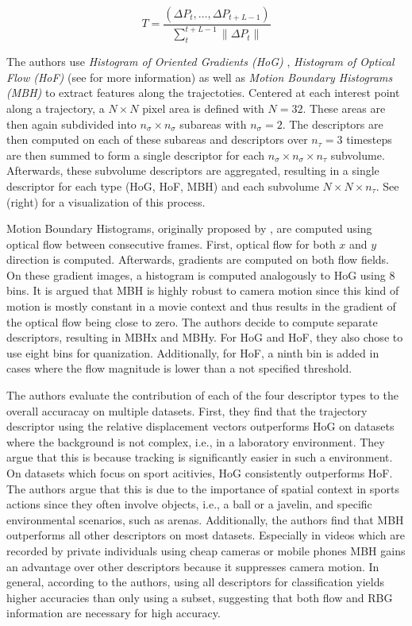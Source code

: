 \begin{equation}
    T = \frac{(\Delta P_t, \dots, \Delta P_{t + L -1})}{\sum_t^{t+L-1} \lVert \Delta P_t \rVert}
\end{equation}

The authors use \textit{Histogram of Oriented Gradients (HoG)} \cite{dalal_histograms_2005}, \textit{Histogram of Optical Flow (HoF)} \cite{laptev_learning_2008} (see  for more information) as well as \textit{Motion Boundary Histograms (MBH)} \cite{dalal_human_2006} to extract features along the trajectoties.
Centered at each interest point along a trajectory, a $N \times N$ pixel area is defined with $N = 32$.
These areas are then again subdivided into $n_\sigma \times n_\sigma$ subareas with $n_\sigma = 2$.
The descriptors are then computed on each of these subareas and descriptors over $n_\tau = 3$ timesteps are then summed to form a single descriptor for each $n_\sigma \times n_\sigma \times n_\tau$ subvolume.
Afterwards, these subvolume descriptors are aggregated, resulting in a single descriptor for each type (HoG, HoF, MBH) and each subvolume $N \times N \times n_\tau$.
See  (right) for a visualization of this process.

Motion Boundary Histograms, originally proposed by \cite{dalal_human_2006}, are computed using optical flow between consecutive frames.
First, optical flow for both $x$ and $y$ direction is computed.
Afterwards, gradients are computed on both flow fields.
On these gradient images, a histogram is computed analogously to HoG using 8 bins.
It is argued that MBH is highly robust to camera motion since this kind of motion is mostly constant in a movie context and thus results in the gradient of the optical flow being close to zero. 
The authors decide to compute separate descriptors, resulting in MBHx and MBHy.
For HoG and HoF, they also chose to use eight bins for quanization.
Additionally, for HoF, a ninth bin is added in cases where the flow magnitude is lower than a not specified threshold.

The authors evaluate the contribution of each of the four descriptor types to the overall accuracay on multiple datasets.
First, they find that the trajectory descriptor using the relative displacement vectors outperforms HoG on datasets where the background is not complex, i.e., in a laboratory environment.
They argue that this is because tracking is significantly easier in such a environment.
On datasets which focus on sport acitivies, HoG consistently outperforms HoF.
The authors argue that this is due to the importance of spatial context in sports actions since they often involve objects, i.e., a ball or a javelin, and specific environmental scenarios, such as arenas.
Additionally, the authors find that MBH outperforms all other descriptors on most datasets.
Especially in videos which are recorded by private individuals using cheap cameras or mobile phones MBH gains an advantage over other descriptors because it suppresses camera motion.
In general, according to the authors, using all descriptors for classification yields higher accuracies than only using a subset, suggesting that both flow and RBG information are necessary for high accuracy.

